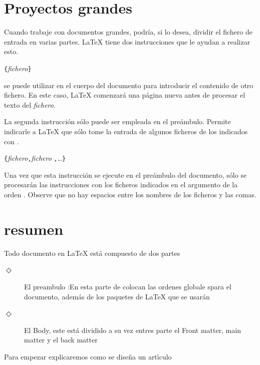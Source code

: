 \section{Proyectos grandes}

Cuando trabaje con documentos grandes, podr\'ia, si lo desea,
dividir el fichero de entrada en varias partes. \LaTeX{} tiene dos
instrucciones que le ayudan a realizar esto.

\begin{command}
\verb|{|\emph{fichero}\verb|}|
\end{command}
\noindent se puede utilizar en el cuerpo del documento para
introducir el contenido de otro fichero. En este caso, \LaTeX{}
comenzar\'a una p\'agina nueva antes de procesar el texto del
\emph{fichero}.

La segunda instrucci\'on s\'olo puede ser empleada en el pre\'ambulo.
Permite indicarle a \LaTeX{} que s\'olo tome la entrada de algunos
ficheros de los indicados con \verb||.

\begin{command}
\verb|{|\emph{fichero}\verb|,|\emph{fichero}%
\verb|,|\ldots\verb|}|
\end{command}

Una vez que esta instrucci\'on se ejecute en el pre\'ambulo del
documento, s\'olo se procesar\'an las instrucciones  con
los ficheros indicados en el argumento de la orden
. Observe que no hay espacios entre los nombres de
los ficheros y las comas.
\section{resumen}
Todo documento en
\LaTeX
est\'{a} compuesto de dos partes

\begin{description}
\item[$\Diamond$] El preambulo :\newline En esta parte de colocan las ordenes
globale spara el documento, adem\'{a}s de los paquetes de
\LaTeX
que se usar\'{a}n

\item[$\Diamond$] El Body, este est\'{a} dividido a su vez entres parte el
Front matter, main matter y el back matter
\end{description}

Para empezar explicaremos como se dise\~{n}a un art\'{\i}culo

